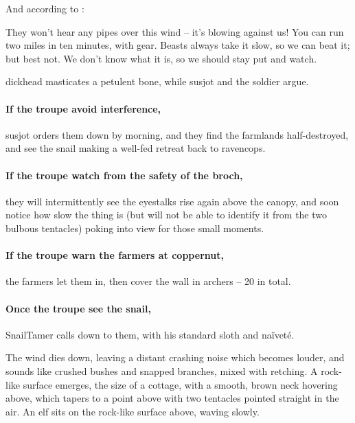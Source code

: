 And according to :

\begin{speechtext}
  They won't hear any pipes over this wind -- it's blowing against us!
  You can run two miles in ten minutes, with gear.
  Beasts always take it slow, so we can beat it; but best not.
  We don't know what it is, so we should stay put and watch.
\end{speechtext}

\begin{boxtext}
  \Gls{dickhead} masticates a petulent bone, while \gls{susjot} and the \gls{soldier} argue.
\end{boxtext}

\paragraph{If the troupe avoid interference,}
\gls{susjot} orders them down by morning, and they find the farmlands half-destroyed, and see the snail making a well-fed retreat back to \gls{ravencops}.

\paragraph{If the troupe watch from the safety of the \gls{broch},}
they will intermittently see the eyestalks rise again above the canopy, and soon notice how slow the thing is (but will not be able to identify it from the two bulbous tentacles) poking into view for those small moments.

\paragraph{If the troupe warn the farmers at \gls{coppernut},}
the farmers let them in, then cover the wall in archers -- 20 in total.

\paragraph{Once the troupe see the snail,}
\gls{SnailTamer} calls down to them, with his standard sloth and na\"ivet\'e.

\begin{boxtext}
  The wind dies down, leaving a distant crashing noise which becomes louder, and sounds like crushed bushes and snapped branches, mixed with  retching.
  A rock-like surface emerges, the size of a cottage, with a smooth, brown neck hovering above, which tapers to a point above with two tentacles pointed straight in the air.
  An elf sits on the rock-like surface above, waving slowly.
\end{boxtext}

